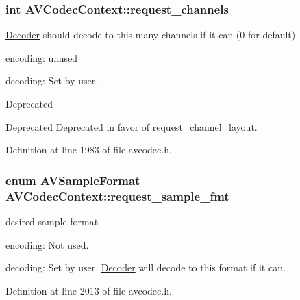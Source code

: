 \subsubsection[{\texorpdfstring{request\+\_\+channels}{request_channels}}]{ {\bf int} A\+V\+Codec\+Context\+::request\+\_\+channels}\hypertarget{struct_a_v_codec_context_a5ad41beeb47aeedd84d1e81dc2ad40e2}{}\label{struct_a_v_codec_context_a5ad41beeb47aeedd84d1e81dc2ad40e2}
\hyperlink{class_decoder}{Decoder} should decode to this many channels if it can (0 for default)
\begin{DoxyItemize}
\item encoding\+: unused
\item decoding\+: Set by user. \begin{DoxyRefDesc}{Deprecated}
\item[\hyperlink{deprecated__deprecated000016}{Deprecated}]Deprecated in favor of request\+\_\+channel\+\_\+layout. \end{DoxyRefDesc}

\end{DoxyItemize}

Definition at line 1983 of file avcodec.\+h.

\subsubsection[{\texorpdfstring{request\+\_\+sample\+\_\+fmt}{request_sample_fmt}}]{\setlength{\rightskip}{0pt plus 5cm}enum {\bf A\+V\+Sample\+Format} A\+V\+Codec\+Context\+::request\+\_\+sample\+\_\+fmt}\hypertarget{struct_a_v_codec_context_a8f43cf7ebfe15119e93fa757572f4601}{}\label{struct_a_v_codec_context_a8f43cf7ebfe15119e93fa757572f4601}
desired sample format
\begin{DoxyItemize}
\item encoding\+: Not used.
\item decoding\+: Set by user. \hyperlink{class_decoder}{Decoder} will decode to this format if it can. 
\end{DoxyItemize}

Definition at line 2013 of file avcodec.\+h.

